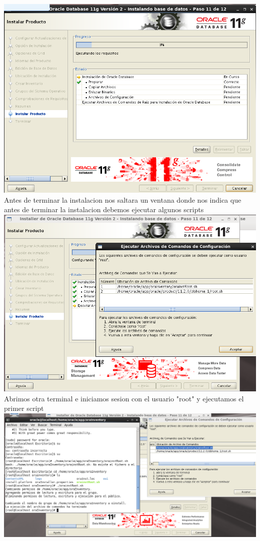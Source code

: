 \documentclass[12pt,letterpaper]{article}
\begin{document}
\begin{center}
\includegraphics[width=15cm]{./oraclelinux/24.png}\\
Antes de terminar la instalacion nos saltara un ventana donde nos indica que antes de terminar la instalacion debemos ejecutar algunos scripts\\
\includegraphics[width=15cm]{./oraclelinux/25.png}\\
Abrimos otra terminal e iniciamos sesion con el usuario "root" y ejecutamos el primer script
\includegraphics[width=15cm]{./oraclelinux/27.png}\\

\end{center}
\end{document}
